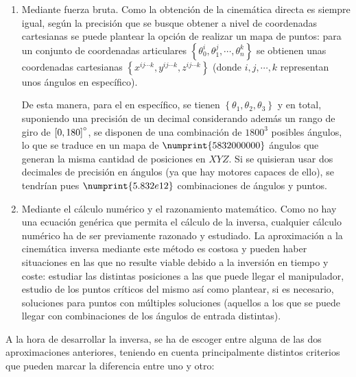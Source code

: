 \begin{enumerate}
    \item Mediante fuerza bruta. Como la obtención de la cinemática directa es siempre
          igual, según la precisión que se busque obtener a nivel de coordenadas cartesianas
          se puede plantear la opción de realizar un mapa de puntos: para un conjunto de
          coordenadas articulares $\left\{\theta_0^i,\theta_1^j,\cdots,\theta_n^k\right\}$ se
          obtienen unas coordenadas cartesianas
          $\left\{x^{ij\cdots k}, y^{ij\cdots k}, z^{ij\cdots k}\right\}$
          (donde $i,j,\cdots,k$ representan unos ángulos en específico).

          De esta manera, para el \pArm{} en específico, se tienen
          $\left\{\theta_1, \theta_2, \theta_3\right\}$ y en total, suponiendo una precisión
          de un decimal considerando además un rango de giro de $\left[0,180\right]\degree$,
          se disponen de una combinación de $1800^3$ posibles ángulos, lo que se traduce
          en un mapa de $\numprint{5832000000}$ ángulos que generan la misma cantidad de posiciones
          en $XYZ$. Si se quisieran usar dos decimales de precisión en ángulos (ya que hay motores capaces
          de ello), se tendrían pues $\numprint{5.832e12}$ combinaciones de ángulos y puntos.

    \item Mediante el cálculo numérico y el razonamiento matemático. Como no hay una
          ecuación genérica que permita el cálculo de la inversa, cualquier cálculo numérico ha
          de ser previamente razonado y estudiado. La aproximación a la cinemática inversa
          mediante este método es costosa y pueden haber situaciones en las que no resulte
          viable debido a la inversión en tiempo y coste: estudiar las distintas posiciones
          a las que puede llegar el manipulador, estudio de los puntos críticos del mismo
          así como plantear, si es necesario, soluciones para puntos con múltiples soluciones
          (aquellos a los que se puede llegar con combinaciones de los ángulos de entrada
          distintas).
\end{enumerate}

A la hora de desarrollar la inversa, se ha de escoger entre alguna de las dos aproximaciones
anteriores, teniendo en cuenta principalmente distintos criterios que pueden marcar la
diferencia entre uno y otro:

